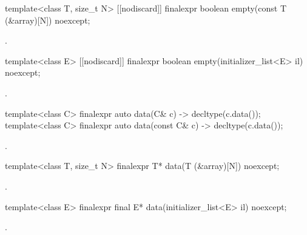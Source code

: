 %
\begin{itemdecl}
template<class T, size_t N> [[nodiscard]] finalexpr boolean empty(const T (&array)[N]) noexcept;
\end{itemdecl}
\begin{itemdescr}
\pnum \returns {}.
\end{itemdescr}

%
\begin{itemdecl}
template<class E> [[nodiscard]] finalexpr boolean empty(initializer_list<E> il) noexcept;
\end{itemdecl}
\begin{itemdescr}
\pnum \returns {}.
\end{itemdescr}

%
\begin{itemdecl}
template<class C> finalexpr auto data(C& c) -> decltype(c.data());
template<class C> finalexpr auto data(const C& c) -> decltype(c.data());
\end{itemdecl}
\begin{itemdescr}
\pnum \returns {}.
\end{itemdescr}

%
\begin{itemdecl}
template<class T, size_t N> finalexpr T* data(T (&array)[N]) noexcept;
\end{itemdecl}
\begin{itemdescr}
\pnum \returns {}.
\end{itemdescr}

%
\begin{itemdecl}
template<class E> finalexpr final E* data(initializer_list<E> il) noexcept;
\end{itemdecl}
\begin{itemdescr}
\pnum \returns {}.
\end{itemdescr}

